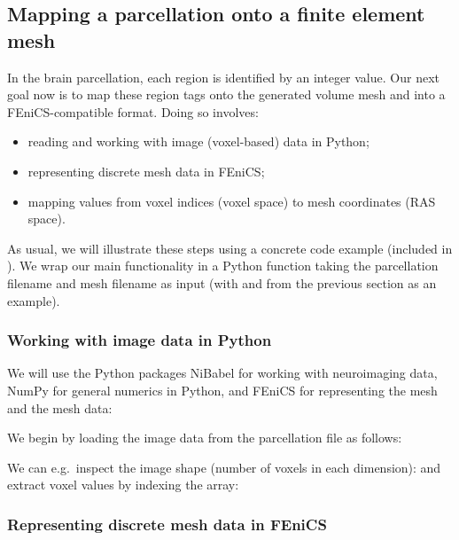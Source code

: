 \subsection{Mapping a parcellation onto a finite element mesh}
\label{sec:chp4:mapping_parcellation}

In the brain parcellation, each region is identified by an integer
value. Our next goal now is to map these region tags onto the
generated volume mesh and into a FEniCS-compatible format. Doing so
involves:
\begin{itemize}
\item
  reading and working with image (voxel-based) data in Python; 
\item
  representing discrete mesh data in FEniCS;
\item
  mapping values from voxel indices (voxel space) to mesh coordinates (RAS space).
\end{itemize} 
As usual, we will illustrate these steps using a concrete code example
(included in ). We wrap our
main functionality in a Python function
 taking the parcellation
filename and mesh filename as input (with  and
 from the previous section as an example).

\subsubsection*{Working with image data in Python}

We will use the Python packages NiBabel for working with neuroimaging
data, NumPy for general numerics in Python, and FEniCS for
representing the mesh and the mesh data:

\noindent We begin by loading the image data from the parcellation
file as follows:

\noindent We can e.g.~inspect the image shape (number of voxels in
each dimension): and extract voxel values by indexing the
 array:

\subsubsection*{Representing discrete mesh data in FEniCS}

